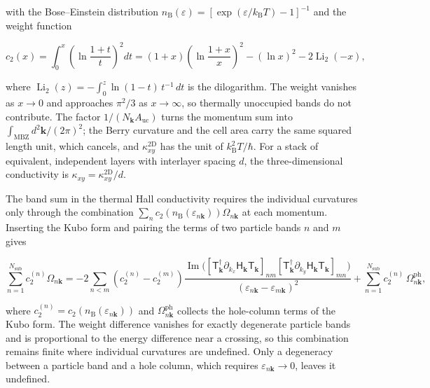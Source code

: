 with the Bose--Einstein distribution \(n_{\mathrm B}(\varepsilon)=[\exp(\varepsilon/k_{\mathrm B}T)-1]^{-1}\) and the weight function

\begin{equation}\label{eq-lswt-thermal-hall-weight}
c_2(x)=\int_0^x\left(\ln\frac{1+t}{t}\right)^2dt
=(1+x)\left(\ln\frac{1+x}{x}\right)^2-(\ln x)^2-2\operatorname{Li}_2(-x),
\end{equation}

where \(\operatorname{Li}_2(z)=-\int_0^z\ln(1-t)\,t^{-1}\,dt\) is the dilogarithm. The weight vanishes as \(x\to0\) and approaches \(\pi^2/3\) as \(x\to\infty\), so thermally unoccupied bands do not contribute. The factor \(1/(N_{\mathbf k}A_{\mathrm{uc}})\) turns the momentum sum into \(\int_{\mathrm{MBZ}}d^2\mathbf k/(2\pi)^2\); the Berry curvature and the cell area carry the same squared length unit, which cancels, and \(\kappa^{\mathrm{2D}}_{xy}\) has the unit of \(k_{\mathrm B}^2T/\hbar\). For a stack of equivalent, independent layers with interlayer spacing \(d\), the three-dimensional conductivity is \(\kappa_{xy}=\kappa^{\mathrm{2D}}_{xy}/d\).

The band sum in the thermal Hall conductivity requires the individual curvatures only through the combination \(\sum_n c_2(n_{\mathrm B}(\varepsilon_{n\mathbf k}))\Omega_{n\mathbf k}\) at each momentum. Inserting the Kubo form and pairing the terms of two particle bands \(n\) and \(m\) gives

\begin{equation}\label{eq-lswt-thermal-hall-pair-form}
\sum_{n=1}^{N_{\mathrm{sub}}}c_2^{(n)}\Omega_{n\mathbf k}
=-2\sum_{n<m}\left(c_2^{(n)}-c_2^{(m)}\right)
\frac{\operatorname{Im}\big([\mathsf T_{\mathbf k}^\dagger\partial_{k_x}\mathsf H_{\mathbf k}\mathsf T_{\mathbf k}]_{nm}[\mathsf T_{\mathbf k}^\dagger\partial_{k_y}\mathsf H_{\mathbf k}\mathsf T_{\mathbf k}]_{mn}\big)}{(\varepsilon_{n\mathbf k}-\varepsilon_{m\mathbf k})^2}
+\sum_{n=1}^{N_{\mathrm{sub}}}c_2^{(n)}\,\Omega^{\mathrm{ph}}_{n\mathbf k},
\end{equation}

where \(c_2^{(n)}=c_2(n_{\mathrm B}(\varepsilon_{n\mathbf k}))\) and \(\Omega^{\mathrm{ph}}_{n\mathbf k}\) collects the hole-column terms of the Kubo form. The weight difference vanishes for exactly degenerate particle bands and is proportional to the energy difference near a crossing, so this combination remains finite where individual curvatures are undefined. Only a degeneracy between a particle band and a hole column, which requires \(\varepsilon_{n\mathbf k}\to0\), leaves it undefined.

